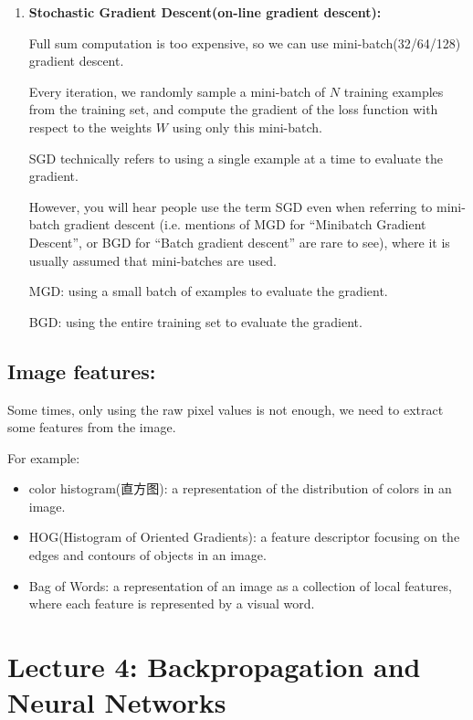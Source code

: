 \documentclass{article}
\numberwithin{equation}{section}
\begin{document}
\begin{CJK}{UTF8}{gbsn}
\begin{enumerate}
\begin{itemize}
        \end{itemize}
    
        \item \textbf{Stochastic Gradient Descent(on-line gradient descent):}\par
        Full sum computation is too expensive, so we can use mini-batch(32/64/128) gradient descent.\par
        Every iteration, we randomly sample a mini-batch of \(N\) training examples from the training set, and compute the gradient of the loss function with respect to the weights \(W\) using only this mini-batch.\par
        
        SGD technically refers to using a single example at a time to evaluate the gradient.\par
        However, you will hear people use the term SGD even when referring to mini-batch gradient descent (i.e. mentions of MGD for “Minibatch Gradient Descent”, or BGD for “Batch gradient descent” are rare to see), where it is usually assumed that mini-batches are used.\par
        MGD: using a small batch of examples to evaluate the gradient.\par
        BGD: using the entire training set to evaluate the gradient.\par
    \end{enumerate}

\subsection{Image features:}
    Some times, only using the raw pixel values is not enough, we need to extract some features from the image.\par
    For example:
    \begin{itemize}
        \item color histogram(直方图): a representation of the distribution of colors in an image.
        \item HOG(Histogram of Oriented Gradients): a feature descriptor focusing on the edges and contours of objects in an image.
        \item Bag of Words: a representation of an image as a collection of local features, where each feature is represented by a visual word.
    \end{itemize}



\newpage
\section*{Lecture 4: Backpropagation and Neural Networks}
\setcounter{section}{4}
\setcounter{subsection}{0}
\setcounter{equation}{0}


\end{CJK}
\end{document}
